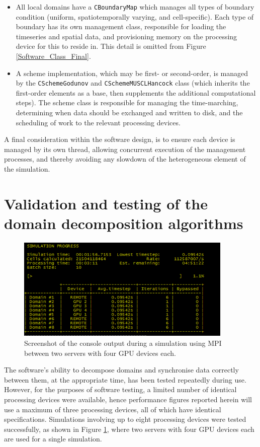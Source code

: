 \begin{itemize}
	\item All local domains have a \texttt{CBoundaryMap} which manages all types of boundary condition (uniform, spatiotemporally varying, and cell-specific). Each type of boundary has its own management class, responsible for loading the timeseries and spatial data, and provisioning memory on the processing device for this to reside in. This detail is omitted from Figure \ref{Software_Class_Final}.
	\item A scheme implementation, which may be first- or second-order, is managed by the \texttt{CSchemeGodunov} and \texttt{CSchemeMUSCLHancock} class (which inherits the first-order elements as a base, then supplements the additional computational steps). The scheme class is responsible for managing the time-marching, determining when data should be exchanged and written to disk, and the scheduling of work to the relevant processing devices.
\end{itemize}

A final consideration within the software design, is to ensure each device is managed by its own thread, allowing concurrent execution of the management processes, and thereby avoiding any slowdown of the heterogeneous element of the simulation.

\section{Validation and testing of the domain decomposition algorithms}

\begin{figure}[tbp]
	\centering
	\includegraphics[width=0.92\textwidth]{decomposition-test-figures/screenshot-remote.png}
	\caption{Screenshot of the console output during a simulation using MPI between two servers with four GPU devices each.}
	\label{TestResult_Screenshot_8Domain}
\end{figure}

The software's ability to decompose domains and synchronise data correctly between them, at the appropriate time, has been tested repeatedly during use. However, for the purposes of software testing, a limited number of identical processing devices were available, hence performance figures reported herein will use a maximum of three processing devices, all of which have identical specifications. Simulations involving up to eight processing devices were tested successfully, as shown in Figure \ref{TestResult_Screenshot_8Domain}, where two servers with four GPU devices each are used for a single simulation.

